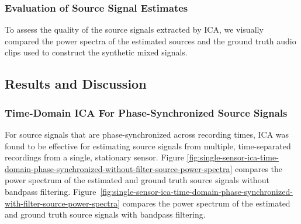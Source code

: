 \documentclass[10pt]{article}
\begin{document}
\subsubsection*{Evaluation of Source Signal Estimates}
To assess the quality of the source signals extracted by ICA, we visually compared the
power spectra of the estimated sources and the ground truth audio clips used to construct
the synthetic mixed signals.


\subsection*{Results and Discussion}

\subsubsection*{Time-Domain ICA For Phase-Synchronized Source Signals}
For source signals that are phase-synchronized across recording times, ICA was found to be
effective for estimating source signals from multiple, time-separated recordings from a
single, stationary sensor.
Figure \ref{fig:single-sensor-ica-time-domain-phase-synchronized-without-filter-source-power-spectra}
compares the power spectrum of the estimated and ground truth source signals
without bandpass filtering.
Figure~\ref{fig:single-sensor-ica-time-domain-phase-synchronized-with-filter-source-power-spectra}
compares the power spectrum of the estimated and ground truth source signals with bandpass
filtering.
\end{document}
